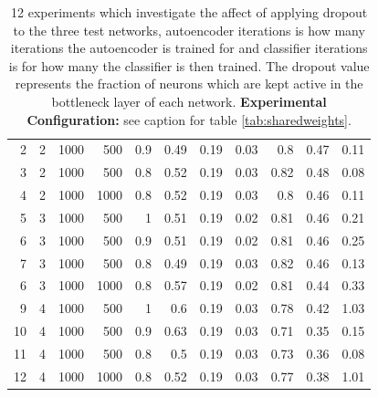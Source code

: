 \begin{table}[h]
{\begin{tabular}{rllrrrrrrrr}
          2                    & 2       & 1000             & 500       & 0.9      & 0.49     & 0.19      & 0.03      & 0.8                  & 0.47                 & 0.11                 \\
          3                    & 2       & 1000             & 500       & 0.8      & 0.52     & 0.19      & 0.03      & 0.82                 & 0.48                 & 0.08                 \\
          4                    & 2       & 1000             & 1000       & 0.8      & 0.52     & 0.19      & 0.03      & 0.8                  & 0.46                 & 0.11                 \\
          \hline
          5                    & 3       & 1000             & 500       & 1        & 0.51     & 0.19      & 0.02      & 0.81                 & 0.46                 & 0.21                 \\
          6                    & 3       & 1000             & 500       & 0.9      & 0.51     & 0.19      & 0.02      & 0.81                 & 0.46                 & 0.25                 \\
          7                    & 3       & 1000             & 500       & 0.8      & 0.49     & 0.19      & 0.03      & 0.82                 & 0.46                 & 0.13                 \\
          6                    & 3       & 1000             & 1000       & 0.8      & 0.57     & 0.19      & 0.02      & 0.81                 & 0.44                 & 0.33                 \\
          \hline
          9                    & 4       & 1000             & 500       & 1        & 0.6      & 0.19      & 0.03      & 0.78                 & 0.42                 & 1.03                 \\
          10                   & 4       & 1000             & 500       & 0.9      & 0.63     & 0.19      & 0.03      & 0.71                 & 0.35                 & 0.15                 \\
          11                   & 4       & 1000             & 500       & 0.8      & 0.5      & 0.19      & 0.03      & 0.73                 & 0.36                 & 0.08\\
          12                   & 4       & 1000             & 1000       & 0.8      & 0.52      & 0.19      & 0.03      & 0.77   & 0.38     & 1.01\\
          \hline
          \end{tabular}
          }
          \caption{12 experiments which investigate the affect of applying dropout to the
          three test networks, autoencoder iterations is how many iterations
          the autoencoder is trained for and classifier iterations is for how many the
          classifier is then trained. The dropout value represents the
          fraction of neurons which are kept active in the bottleneck layer of each network.
          {\bf Experimental Configuration:} see caption for table \ref{tab:sharedweights}.}
          \label{tab:dropout}
          \end{table}

